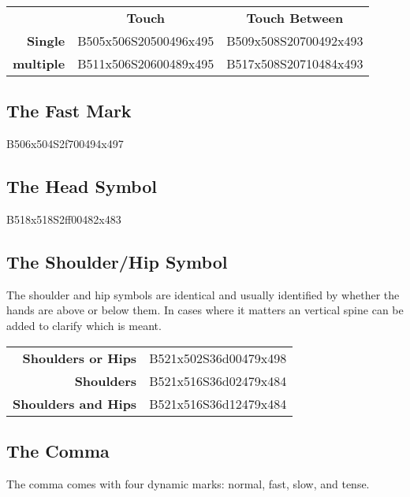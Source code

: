 \documentclass{article}
\begin{document}
\begin{center}
\begin{tabular}{r*{2}{c}}
&\textbf{Touch}&\textbf{Touch Between}\\
\textbf{Single}&B505x506S20500496x495&B509x508S20700492x493\\
\textbf{multiple}&B511x506S20600489x495&B517x508S20710484x493\\
\end{tabular}
\end{center}

\subsection{The Fast Mark}

\begin{center}
B506x504S2f700494x497
\end{center}

\subsection{The Head Symbol}

\begin{center}
B518x518S2ff00482x483
\end{center}

\subsection{The Shoulder/Hip Symbol}

The shoulder and hip symbols are identical and usually identified by whether the hands are above or below them.
In cases where it matters an vertical spine can be added to clarify which is meant.

\begin{center}
\begin{tabular}{rc}
 \textbf{Shoulders or Hips}&B521x502S36d00479x498\\
         \textbf{Shoulders}&B521x516S36d02479x484\\
\textbf{Shoulders and Hips}&B521x516S36d12479x484\\
\end{tabular}
\end{center}

\subsection{The Comma}

The comma comes with four dynamic marks: normal, fast, slow, and tense.
\end{document}
